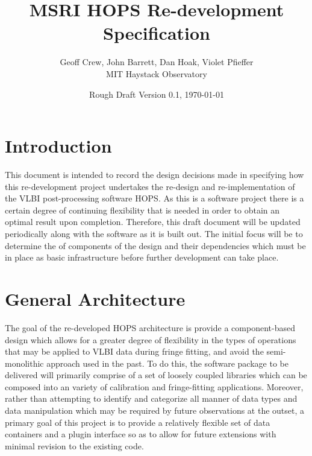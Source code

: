 \documentclass[hidelinks]{article}
\title{ \textbf{MSRI HOPS Re-development Specification} }
\author{
\large Geoff Crew, John Barrett, Dan Hoak, Violet Pfieffer \\
\Large MIT Haystack Observatory}
\date{Rough Draft Version 0.1, \today}
\let\Oldsection\section
\renewcommand{\section}{\FloatBarrier\Oldsection}
\begin{document}
\maketitle


\tiny
\tableofcontents
\normalsize
\newpage

\section{Introduction}

This document is intended to record the design decisions made in specifying how this re-development project undertakes the
re-design and re-implementation of the VLBI post-processing software HOPS. As this is a software project there is a certain
degree of continuing flexibility that is needed in order to obtain an optimal result upon completion. Therefore, this 
draft document will be updated periodically along with the software as it is built out. The initial focus will be to determine
the of components of the design and their dependencies which must be in place as basic infrastructure before further development
can take place.


\section{General Architecture}

The goal of the re-developed HOPS architecture is provide a component-based design which allows for a greater degree of flexibility
in the types of operations that may be applied to VLBI data during fringe fitting, and avoid the semi-monolithic approach used in the past.
To do this, the software package to be delivered will primarily comprise of a set of loosely coupled libraries which can be composed
into an variety of calibration and fringe-fitting applications. Moreover, rather than attempting to identify and categorize all manner of data
types and data manipulation which may be required by future observations at the outset, a primary goal of this project is to provide a
relatively flexible set of data containers and a plugin interface so as to allow for future extensions with minimal revision to the existing code.
\end{document}
